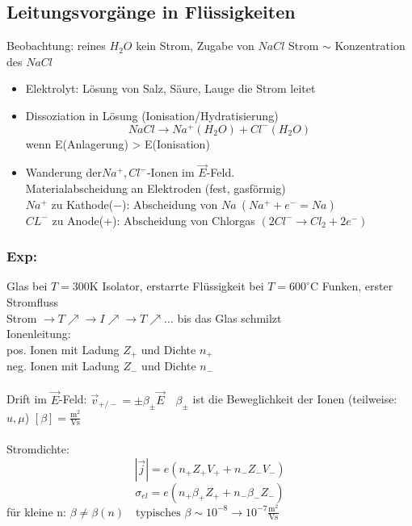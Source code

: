 \documentclass[titlepage,12pt,a4paper,ngerman]{report}
\newcommand{\tx}[1]{\textrm{#1}}
\begin{document}
\subsection{Leitungsvorgänge in Flüssigkeiten}
Beobachtung: reines $ H_2O $ kein Strom, Zugabe von $ NaCl $ Strom $\sim$ Konzentration des $ NaCl $
\begin{itemize}
	\item Elektrolyt: Lösung von Salz, Säure, Lauge die Strom leitet
	\item Dissoziation in Lösung (Ionisation/Hydratisierung)
	$$ NaCl \rightarrow Na^+ (H_2O) + Cl^- (H_2O)$$
	wenn E(Anlagerung) > E(Ionisation)
	\item Wanderung der$ Na^+ , Cl^- $-Ionen im $ \vec{E} $-Feld.\\ Materialabscheidung an Elektroden (fest, gasförmig)\\
	$ Na^+ $ zu Kathode($-$): Abscheidung von $ Na  \ (Na^+ + e^- = Na)$\\
	$ CL^- $ zu Anode(+): Abscheidung von Chlorgas $ (2 Cl^- \rightarrow Cl_2 + 2 e^-) $
\end{itemize}
\subsubsection{Exp:} Glas bei $ T = 300 \tx{K} $ Isolator, erstarrte Flüssigkeit bei $ T = 600^\circ \tx{C} $ Funken, erster Stromfluss\\
Strom $ \rightarrow  T\nearrow \rightarrow I\nearrow \rightarrow T\nearrow \dots$ bis das Glas schmilzt\\
Ionenleitung:\\
pos. Ionen mit Ladung $ Z_+ $ und Dichte $ n_+ $\\
neg. Ionen mit Ladung $ Z_- $ und Dichte $ n_- $\\\\
Drift im $ \vec{E} $-Feld: $ \vec{v}_{+/-} = \pm \beta_{\pm} \vec{E} \quad \beta_{\pm}$ ist die Beweglichkeit der Ionen (teilweise: $ u, \mu $) $ [\beta] = \frac{\tx{m}^2}{\tx{Vs}} $\\\\
Stromdichte: 
$$|\vec{j}| = e(n_+ Z_+ V_+ + n_- Z_- V_-)$$
$$\sigma_{el} = e(n_+\beta_+ Z_+ + n_- \beta_- Z_-)$$
für kleine n: $ \beta \neq \beta(n) \quad \tx{typisches } \beta \sim 10^{-8} \rightarrow 10^{-7} \frac{\tx{m}^2}{\tx{Vs}}$
\end{document}
